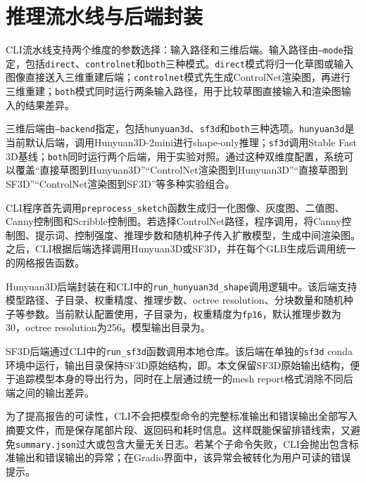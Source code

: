 \section{推理流水线与后端封装}

CLI流水线支持两个维度的参数选择：输入路径和三维后端。输入路径由\texttt{--mode}指定，包括\texttt{direct}、\texttt{controlnet}和\texttt{both}三种模式。\texttt{direct}模式将归一化草图或输入图像直接送入三维重建后端；\texttt{controlnet}模式先生成ControlNet渲染图，再进行三维重建；\texttt{both}模式同时运行两条输入路径，用于比较草图直接输入和渲染图输入的结果差异。

三维后端由\texttt{--backend}指定，包括\texttt{hunyuan3d}、\texttt{sf3d}和\texttt{both}三种选项。\texttt{hunyuan3d}是当前默认后端，调用Hunyuan3D-2mini进行shape-only推理；\texttt{sf3d}调用Stable Fast 3D基线；\texttt{both}同时运行两个后端，用于实验对照。通过这种双维度配置，系统可以覆盖“直接草图到Hunyuan3D”“ControlNet渲染图到Hunyuan3D”“直接草图到SF3D”“ControlNet渲染图到SF3D”等多种实验组合。

CLI程序首先调用\texttt{preprocess\_sketch}函数生成归一化图像、灰度图、二值图、Canny控制图和Scribble控制图。若选择ControlNet路径，程序调用，将Canny控制图、提示词、控制强度、推理步数和随机种子传入扩散模型，生成中间渲染图。之后，CLI根据后端选择调用Hunyuan3D或SF3D，并在每个GLB生成后调用统一的网格报告函数。

Hunyuan3D后端封装在和CLI中的\texttt{run\_hunyuan3d\_shape}调用逻辑中。该后端支持模型路径、子目录、权重精度、推理步数、octree resolution、分块数量和随机种子等参数。当前默认配置使用，子目录为，权重精度为\texttt{fp16}，默认推理步数为30，octree resolution为256。模型输出目录为。

SF3D后端通过CLI中的\texttt{run\_sf3d}函数调用本地仓库。该后端在单独的\texttt{sf3d} conda环境中运行，输出目录保持SF3D原始结构，即。本文保留SF3D原始输出结构，便于追踪模型本身的导出行为，同时在上层通过统一的mesh report格式消除不同后端之间的输出差异。

为了提高报告的可读性，CLI不会把模型命令的完整标准输出和错误输出全部写入摘要文件，而是保存尾部片段、返回码和耗时信息。这样既能保留排错线索，又避免\texttt{summary.json}过大或包含大量无关日志。若某个子命令失败，CLI会抛出包含标准输出和错误输出的异常；在Gradio界面中，该异常会被转化为用户可读的错误提示。


